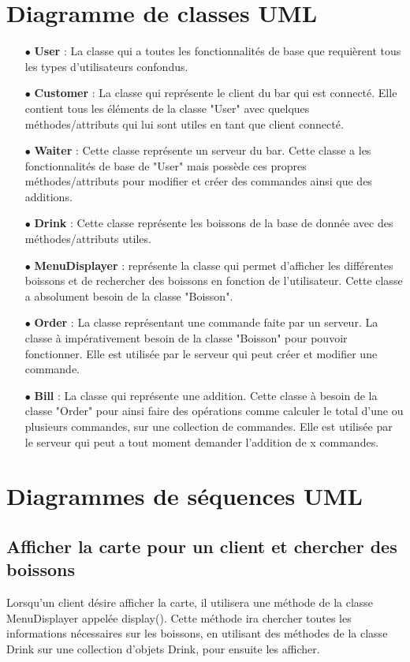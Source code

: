 


\section{Diagramme de classes UML}
\begin{itemize}
	\item[{$\bullet$}] \textbf{User} : La classe qui a toutes les fonctionnalités de base que requièrent
	tous les types d'utilisateurs confondus.
	\item[{$\bullet$}] \textbf{Customer} : La classe qui représente le client du bar qui est connecté.
	Elle contient tous les éléments de la classe "User" avec quelques méthodes/attributs qui lui sont utiles
	en tant que client connecté.
	\item[{$\bullet$}] \textbf{Waiter} : Cette classe représente un serveur du bar. Cette classe a les
	fonctionnalités de base de "User" mais possède ces propres méthodes/attributs pour modifier et créer
	des commandes ainsi que des additions.
	\item[{$\bullet$}] \textbf{Drink} : Cette classe représente les boissons de la base de donnée avec
	des méthodes/attributs utiles. 
	\item[{$\bullet$}] \textbf{MenuDisplayer} : représente la classe qui permet d'afficher les
	différentes boissons et de rechercher des boissons en fonction de l'utilisateur. Cette classe a
	absolument besoin de la classe "Boisson".
	\item[{$\bullet$}] \textbf{Order} : La classe représentant une commande faite par un serveur. La
	classe à impérativement besoin de la classe "Boisson" pour pouvoir fonctionner. Elle est utilisée par
	le serveur qui peut créer et modifier une commande.
	\item[{$\bullet$}] \textbf{Bill} : La classe qui représente une addition. Cette classe à besoin de
	la classe "Order" pour ainsi faire des opérations comme calculer le total d'une ou plusieurs
	commandes, sur une collection de commandes. Elle est utilisée par le serveur qui peut a tout moment
	demander l'addition de x commandes.
\end{itemize}
\section{Diagrammes de séquences UML}
\subsection{Afficher la carte pour un client et chercher des boissons}
Lorsqu'un client désire afficher la carte, il utilisera une méthode de la classe MenuDisplayer appelée display(). Cette méthode ira chercher toutes les informations nécessaires sur les boissons, en utilisant des méthodes de la classe Drink sur une collection d'objets Drink, pour ensuite les afficher. 

